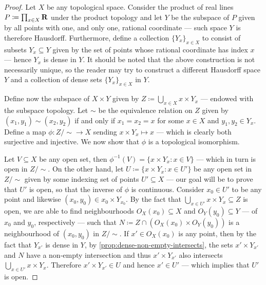 \begin{proof}
    Let \(X\) be any topological space. Consider the product of real lines
    \(P \coloneq \prod_{x \in X} \mathbf{R}\) under the product topology and let \(Y\) be
    the subspace of \(P\) given by all points with one, and only one, rational
    coordinate --- such space \(Y\) is therefore Hausdorff. Furthermore, define a
    collection \(\{Y_{x}\}_{x \in X}\) to consist of subsets \(Y_x \subseteq Y\)
    given by the set of points whose rational coordinate has index \(x\) --- hence
    \(Y_x\) is dense in \(Y\). It should be noted that the above construction is
    not necessarily unique, so the reader may try to construct a different Hausdorff
    space \(Y\) and a collection of dense sets \(\{Y_{x}\}_{x \in X}\) in \(Y\).

    Define now the subspace of \(X \times Y\) given by
    \(Z \coloneq \bigcup_{x \in X} x \times Y_x\) --- endowed with the subspace
    topology. Let \(\sim\) be the equivalence relation on \(Z\) given by
    \((x_1, y_1) \sim (x_2, y_2)\) if and only if \(x_1 = x_2 = x\) for some
    \(x \in X\) and \(y_1, y_2 \in Y_x\). Define a map \(\phi: Z/{\sim} \to X\)
    sending \(x \times Y_x \mapsto x\) --- which is clearly both surjective and
    injective. We now show that \(\phi\) is a topological isomorphism.

    Let \(V \subseteq X\) be any open set, then
    \(\phi^{-1}(V) = \{x \times Y_x \colon x \in V\}\) --- which in turn is open in
    \(Z/{\sim}\). On the other hand, let
    \(U \coloneq \{x \times Y_{x} \colon x \in U'\}\) be any open set in
    \(Z/{\sim}\) given by some indexing set of points \(U' \subseteq X\) --- our
    goal will be to prove that \(U'\) is open, so that the inverse of \(\phi\) is
    continuous. Consider \(x_0 \in U'\) to be any point and likewise
    \((x_0, y_0) \in x_0 \times Y_{x_0}\). By the fact that
    \(\bigcup_{x \in U'} x \times Y_x \subseteq Z\) is open, we are able to find
    neighbourhoods \(O_X(x_0) \subseteq X\) and \(O_Y(y_0) \subseteq Y\) --- of
    \(x_0\) and \(y_0\), respectively --- such that
    \(N \coloneq Z \cap (O_X(x_0) \times O_Y(y_0))\) is a neighbourhood of
    \((x_0, y_0)\) in \(Z/{\sim}\). If \(x' \in O_X(x_0)\) is any point, then by the
    fact that \(Y_{x'}\) is dense in \(Y\), by
    \cref{prop:dense-non-empty-intersects}, the sets \(x' \times Y_{x'}\) and \(N\)
    have a non-empty intersection and thus \(x' \times Y_{x'}\) also intersects
    \(\bigcup_{x \in U'} x \times Y_x\). Therefore \(x' \times Y_{x'} \in U\) and
    hence \(x' \in U'\) --- which implies that \(U'\) is open.
\end{proof}


